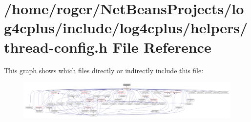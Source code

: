 \hypertarget{thread-config_8h}{\section{/home/roger/\-Net\-Beans\-Projects/log4cplus/include/log4cplus/helpers/thread-\/config.h File Reference}
\label{thread-config_8h}
}
This graph shows which files directly or indirectly include this file\-:
\nopagebreak
\begin{figure}[H]
\begin{center}
\leavevmode
\includegraphics[width=350pt]{thread-config_8h__dep__incl}
\end{center}
\end{figure}
